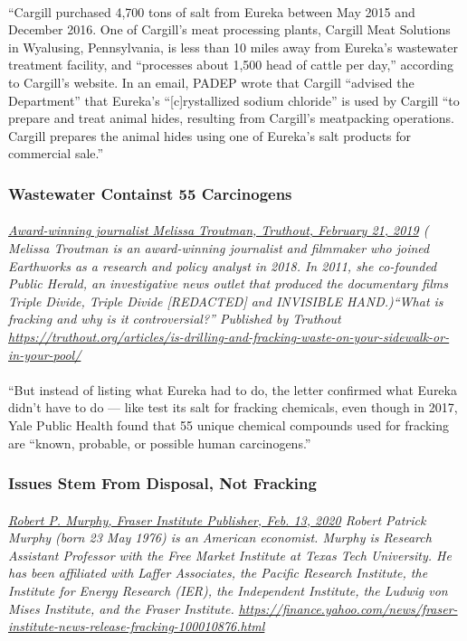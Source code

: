 \documentclass{article}
\begin{document}
\paragraph{}
``Cargill purchased 4,700 tons of salt from Eureka between May 2015 and December 2016. One of Cargill’s meat processing plants, Cargill Meat Solutions in Wyalusing, Pennsylvania, is less than 10 miles away from Eureka’s wastewater treatment facility, and “processes about 1,500 head of cattle per day,” according to Cargill’s website. In an email, PADEP wrote that Cargill “advised the Department” that Eureka’s “[c]rystallized sodium chloride” is used by Cargill “to prepare and treat animal hides, resulting from Cargill’s meatpacking operations. Cargill prepares the animal hides using one of Eureka’s salt products for commercial sale.”

\subsubsection{Wastewater Containst 55 Carcinogens}
\paragraph{}
\small
\textit{
\underline{Award-winning journalist Melissa Troutman, Truthout, February 21, 2019}
( Melissa Troutman is an award-winning journalist and filmmaker who joined Earthworks as a research and policy analyst in 2018. In 2011, she co-founded Public Herald, an investigative news outlet that produced the documentary films Triple Divide, Triple Divide [REDACTED] and INVISIBLE HAND.)``What is fracking and why is it controversial?'' Published by Truthout
\url{https://truthout.org/articles/is-drilling-and-fracking-waste-on-your-sidewalk-or-in-your-pool/}}
\normalsize
\paragraph{}
``But instead of listing what Eureka had to do, the letter confirmed what Eureka didn’t have to do — like test its salt for fracking chemicals, even though in 2017, Yale Public Health found that 55 unique chemical compounds used for fracking are “known, probable, or possible human carcinogens.”

\subsubsection{Issues Stem From Disposal, Not Fracking}
\paragraph{}
\small
\textit{
\underline{Robert P. Murphy, Fraser Institute Publisher, Feb. 13, 2020}
Robert Patrick Murphy (born 23 May 1976) is an American economist. Murphy is Research Assistant Professor with the Free Market Institute at Texas Tech University. He has been affiliated with Laffer Associates, the Pacific Research Institute, the Institute for Energy Research (IER), the Independent Institute, the Ludwig von Mises Institute, and the Fraser Institute. 
\url{https://finance.yahoo.com/news/fraser-institute-news-release-fracking-100010876.html}}
\end{document}
